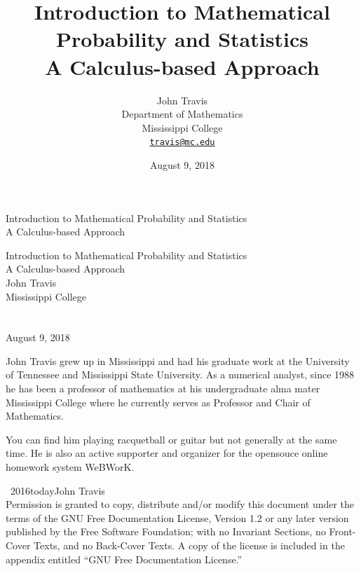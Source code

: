 \documentclass[10pt,]{book}
\title{Introduction to Mathematical Probability and Statistics\\
{\large A Calculus-based Approach}}
\author{John Travis\\
Department of Mathematics\\
Mississippi College\\
\href{mailto:travis@mc.edu}{\nolinkurl{travis@mc.edu}}
}
\date{August 9, 2018}
\theoremstyle{plain}
\theoremstyle{definition}
\theoremstyle{definition}
\theoremstyle{definition}
\numberwithin{equation}{section}
\begin{document}
\frontmatter
\thispagestyle{empty}
{\centering
\vspace*{0.28\textheight}
{\Huge Introduction to Mathematical Probability and Statistics}\\[2\baselineskip]
{\LARGE A Calculus-based Approach}\\
}
\clearpage
\thispagestyle{empty}
\null%
\clearpage
\thispagestyle{empty}
{\centering
\vspace*{0.14\textheight}
{\Huge Introduction to Mathematical Probability and Statistics}\\[\baselineskip]
{\LARGE A Calculus-based Approach}\\[3\baselineskip]
{\Large John Travis}\\[0.5\baselineskip]
{\Large Mississippi College}\\[3\baselineskip]
{\Large }\\[0.5\baselineskip]
{\normalsize }\\[3\baselineskip]
{\Large August 9, 2018}\\}
\clearpage
\thispagestyle{empty}
\noindent
John Travis grew up in Mississippi and had his graduate work at the University of Tennessee and Mississippi State University. As a numerical analyst, since 1988 he has been a professor of mathematics at his undergraduate alma mater Mississippi College where he currently serves as Professor and Chair of Mathematics.%
\par
You can find him playing racquetball or guitar but not generally at the same time. He is also an active supporter and organizer for the opensouce online homework system WeBWorK.%
\par
{}
\noindent\textcopyright\ 2016\textendash{}today\quad{}John Travis\\[0.5\baselineskip]
Permission is granted to copy, distribute and/or modify this document under the terms of the GNU Free Documentation License, Version 1.2 or any later version published by the Free Software Foundation; with no Invariant Sections, no Front-Cover Texts, and no Back-Cover Texts.  A copy of the license is included in the appendix entitled ``GNU Free Documentation License.''\par\medskip
{}
\null\clearpage
\end{document}
